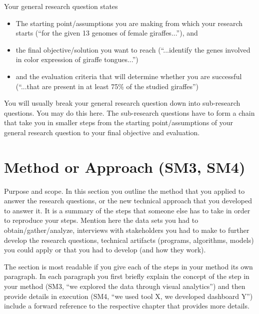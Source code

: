 \documentclass[12pt,a4paper,footinclude=true,twoside,headinclude=true]{report}
\begin{document}
Your general research question states
\begin{itemize}
    \item The starting point/assumptions you are making from which your research starts (``for the given 13 genomes of female giraffes...''), and
    \item the final objective/solution you want to reach (``...identify the genes involved in color expression of giraffe tongues...'')
    \item and the evaluation criteria that will determine whether you are successful (``...that are present in at least 75\% of the studied giraffes'')
\end{itemize}

You will usually break your general research question down into sub-research questions. You may do this here. The sub-research questions have to form a chain that take you in smaller steps from the starting point/assumptions of your general research question to your final objective and evaluation.

\section{Method or Approach (SM3, SM4)}\label{sec:introduction:method}
 
\textsf{Purpose and scope}. In this section you outline the method that you applied to answer the research questions, or the new technical approach that you developed to answer it. It is a summary of the steps that someone else has to take in order to reproduce your steps. Mention here the data sets you had to obtain/gather/analyze, interviews with stakeholders you had to make to further develop the research questions, technical artifacts (programs, algorithms, models) you could apply or that you had to develop (and how they work).

The section is most readable if you give each of the steps in your method its own paragraph. In each paragraph you first briefly explain the concept of the step in your method (SM3, ``we explored the data through visual analytics'') and then provide details in execution (SM4, ``we used tool X, we developed dashboard Y'') include a forward reference to the respective chapter that provides more details.

\end{document}

